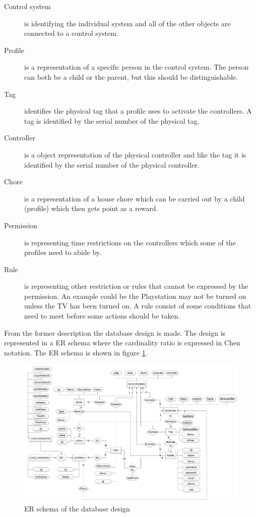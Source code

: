 \begin{description}
	\item[Control system] is identifying the individual system and all of the other objects are connected to a control system.
	\item[Profile] is a representation of a specific person in the control system. The person can both be a child or the parent, but this should be distinguishable.
	\item[Tag] identifies the physical tag that a profile uses to activate the controllers. A tag is identified by the serial number of the physical tag.
	\item[Controller]	is a object representation of the physical controller and like the tag it is identified by the serial number of the physical controller.
	\item[Chore] is a representation of a house chore which can be carried out by a child (profile) which then gets point as a reward.
	\item[Permission] is representing time restrictions on the controllers which some of the profiles need to abide by. 
	\item[Rule] is representing other restriction or rules that cannot be expressed by the permission. An example could be the Playstation may not be turned on unless the TV has been turned on. A rule consist of some conditions that need to meet before some actions should be taken. 
\end{description}

From the former description the database design is made. The design is represented in a ER schema where the cardinality ratio is expressed in 
Chen notation. The ER schema is shown in figure \ref{fig:ERdiagram}. 

\begin{figure}
	\centering
		\includegraphics[width=1.00\textwidth]{images/ERdiagram.jpg}
	\caption{ER schema of the database design}
	\label{fig:ERdiagram}
\end{figure}

